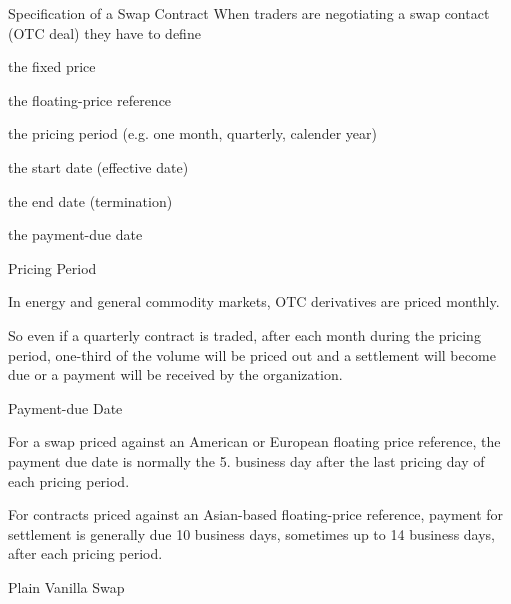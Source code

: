 {Specification of a Swap Contract}
When traders are negotiating a swap contact (OTC deal) they have to define






	the fixed price


	the floating-price reference


	the pricing period (e.g. one month, quarterly, calender year)


	the start date (effective date)


	the end date (termination)


	the payment-due date





{Pricing Period}






	In energy and general commodity markets, OTC derivatives are priced monthly.


	So even if a quarterly contract is traded, after each month during the pricing period, one-third of the volume will be priced out and a settlement will become due or a payment will be received by the organization.





{Payment-due Date}






	For a swap priced against an American or European floating price reference, the payment due date is normally the 5. business day after the last pricing day of each pricing period.


	
For contracts priced against an Asian-based floating-price reference, payment for settlement is generally due 10 business days, sometimes up to 14 business days, after each pricing period.






{Plain Vanilla Swap}






